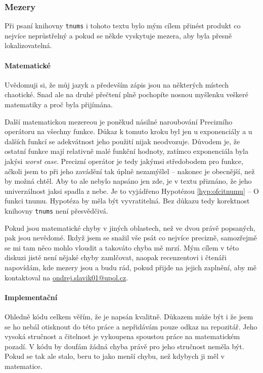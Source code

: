 \subsubsection{Mezery}
Při psaní knihovny \texttt{tnums} i tohoto textu bylo mým cílem přinést produkt co nejvíce neprůstřelný a pokud se někde vyskytuje mezera, aby byla přesně lokalizovatelná.

\paragraph{Matematické}\label{par:matematickemezery} Uvědomuji si, že můj jazyk a především zápis jsou na některých místech chaotické. Snad ale na druhé přečtení plně pochopíte nosnou myšlenku veškeré matematiky a proč byla přijímána.

Další matematickou mezereou je poněkud násilné naroubování Precizního operátoru na všechny funkce. Důkaz k tomuto kroku byl jen u exponenciály a u dalších funkcí se adekvátnost jeho použití nijak neodvozuje. Důvodem je, že ostatní funkce mají relativně malé funkční hodnoty, zatímco exponenciála byla jakýsi \textit{worst case}. Precizní operátor je tedy jakýmsi středobodem pro funkce, ačkoli jsem to při jeho zavádění tak úplně nezamýšlel -- nakonec je obecnější, než by možná chtěl. Aby to ale nebylo napsáno jen zde, je v textu přiznáno, že jeho univerzálnost jaksi spadla z nebe. Je to vyjádřeno Hypotézou \ref{hyp:ofcitnumu} -- O funkci tnumu. Hypotéza by měla být vyvratitelná. Bez důkazu tedy korektnost knihovny \texttt{tnums} není přesvědčivá.

Pokud jsou matematické chyby v jiných oblastech, než ve dvou právě popsaných, pak jsou nevědomé. Ikdyž jsem se snažil vše psát co nejvíce precizně, samozřejmě se mi tam něco mohlo vloudit a takováto chyba mě mrzí. Mým cílem v této diskuzi jistě není nějaké chyby zamlčovat, naopak recenzentovi i čtenáři napovídám, kde mezery jsou a budu rád, pokud přijde na jejich zaplnění, aby mě kontaktoval na \href{mailto:ondrej.slavik01@upol.cz}{ondrej.slavik01@upol.cz}.

\paragraph{Implementační} Ohledně kódu celkem věřím, že je napsán kvalitně. Důkazem může být i že jsem se ho nebál otisknout do této práce a nepřidávám pouze odkaz na repozitář. Jeho vysoká stručnost a čitelnost je vykoupena spoustou práce na matematickém pozadí. V kódu by doufám žádná chyba právě pro jeho stručnost neměla být. Pokud se tak ale stalo, beru to jako menší chybu, než kdybych ji měl v matematice.

